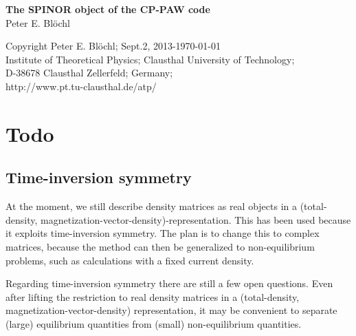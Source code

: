 \documentclass[11pt,a4paper]{report}
\begin{document}
\begin{titlepage}
\begin{center}
\vspace*{3.5cm}
{\huge \textbf{The SPINOR object of the CP-PAW code}}\\
\vspace{0.5cm}
{\large Peter E. Bl\"ochl}
\vspace{0.5cm} 
\end{center}

\vfill
\begin{center}
Copyright Peter E. Bl\"ochl; Sept.2, 2013-\today\\
{\small
Institute of Theoretical Physics;
Clausthal University of Technology;\\ 
D-38678 Clausthal Zellerfeld; Germany;\\
http://www.pt.tu-clausthal.de/atp/}
\end{center}
\end{titlepage}
\noindent            
\tableofcontents
\newpage
\chapter{Todo}
\section{Time-inversion symmetry}
At the moment, we still describe density matrices as real objects in a
(total-density, magnetization-vector-density)-representation. This has
been used because it exploits time-inversion symmetry. The plan is to
change this to complex matrices, because the method can then be
generalized to non-equilibrium problems, such as calculations with a
fixed current density.


Regarding time-inversion symmetry there are still a few open
questions. Even after lifting the restriction to real density matrices
in a (total-density, magnetization-vector-density) representation, it
may be convenient to separate (large) equilibrium quantities from
(small) non-equilibrium quantities.
\end{document}
